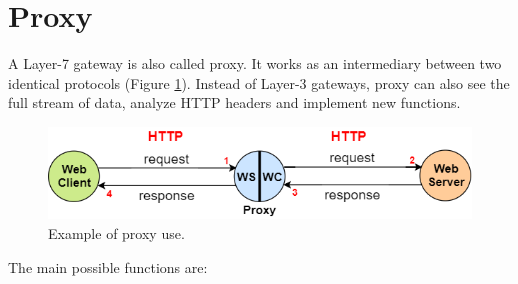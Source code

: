 \section{Proxy}
A Layer-7 gateway is also called proxy. It works as an intermediary between two identical protocols (Figure \ref{proxy}). Instead of Layer-3 gateways, proxy can also see the full stream of data, analyze HTTP headers and implement new functions. 
\begin{figure}[h]
\centering
\includegraphics[scale=0.42]{Images/Gateway/proxy}
\caption{\footnotesize{Example of proxy use.}}\label{proxy}
\end{figure}
The main possible functions are:
